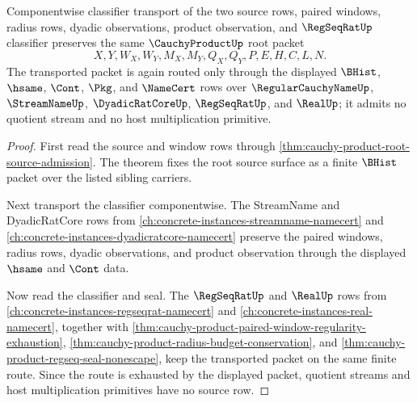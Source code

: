 \begin{theorem}
\label{thm:cauchy-product-root-classifier-stability}
Componentwise classifier transport of the two source rows, paired windows, radius rows, dyadic observations, product observation, and $\RegSeqRatUp$ classifier preserves the same $\CauchyProductUp$ root packet
$$
X,Y,W_X,W_Y,M_X,M_Y,Q_X,Q_Y,P,E,H,C,L,N.
$$
The transported packet is again routed only through the displayed $\BHist$, $\hsame$, $\Cont$, $\Pkg$, and $\NameCert$ rows over $\RegularCauchyNameUp$, $\StreamNameUp$, $\DyadicRatCoreUp$, $\RegSeqRatUp$, and $\RealUp$; it admits no quotient stream and no host multiplication primitive.
\end{theorem}
\begin{proof}
First read the source and window rows through \autoref{thm:cauchy-product-root-source-admission}. The theorem fixes the root source surface as a finite $\BHist$ packet over the listed sibling carriers.

Next transport the classifier componentwise. The StreamName and DyadicRatCore rows from \autoref{ch:concrete-instances-streamname-namecert} and \autoref{ch:concrete-instances-dyadicratcore-namecert} preserve the paired windows, radius rows, dyadic observations, and product observation through the displayed $\hsame$ and $\Cont$ data.

Now read the classifier and seal. The $\RegSeqRatUp$ and $\RealUp$ rows from \autoref{ch:concrete-instances-regseqrat-namecert} and \autoref{ch:concrete-instances-real-namecert}, together with \autoref{thm:cauchy-product-paired-window-regularity-exhaustion}, \autoref{thm:cauchy-product-radius-budget-conservation}, and \autoref{thm:cauchy-product-regseq-seal-nonescape}, keep the transported packet on the same finite route. Since the route is exhausted by the displayed packet, quotient streams and host multiplication primitives have no source row.
\end{proof}


